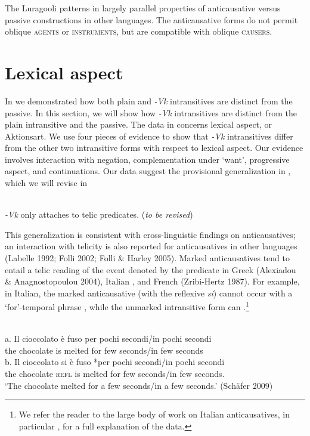 \documentclass[output=paper]{langsci/langscibook}
\begin{document}
The Luragooli patterns in  largely parallel properties of anticausative versus passive constructions in other languages. The anticausative forms do not permit oblique \textsc{agents} or \textsc{instruments}, but are compatible with oblique \textsc{causers.}

\section{Lexical aspect}

In  we demonstrated how both plain and \textit{-Vk} intransitives are distinct from the passive. In this section, we will show how \textit{-Vk }intransitives are distinct from the plain intransitive and the passive. The data in  concerns lexical aspect, or Aktionsart. We use four pieces of evidence to show that \textit{-Vk} intransitives differ from the other two intransitive forms with respect to lexical aspect. Our evidence involves interaction with negation, complementation under ‘want’, progressive aspect, and continuations. Our data suggest the provisional generalization in , which we will revise in 

\ea\label{exx:}
{}\\
 \textit{-Vk }only attaches to telic predicates. (\textit{to be revised})
\z

This generalization is consistent with cross-linguistic findings on anticausatives; an interaction with telicity is also reported for anticausatives in other languages (Labelle 1992; Folli 2002; Folli \& Harley 2005). Marked anticausatives tend to entail a telic reading of the event denoted by the predicate in Greek (Alexiadou \& Anagnostopoulou 2004), Italian \citep{Folli2002}, and French (Zribi-Hertz 1987). For example, in Italian, the marked anticausative (with the reflexive \textit{si}) cannot occur with a ‘for’-temporal phrase , while the unmarked intransitive form can .\footnote{ We refer the reader to the large body of work on Italian anticausatives, in particular \citet{Folli2002}, for a full explanation of the data.}

\ea\label{exx:}
\ea
{}\\
\ex
\gll a.  Il   cioccolato è  fuso     per pochi secondi/in pochi secondi\\
       the chocolate  is melted for few    seconds/in few    seconds\\
\ex       
\gll b.  Il    cioccolato si     è  fuso     *per pochi secondi/in pochi secondi\\
       the chocolate  \textsc{refl} is melted  for   few   seconds/in few seconds. \\
\glt ‘The chocolate melted for a few seconds/in a few seconds.’     (Schäfer 2009)
\z
\z
\end{document}
